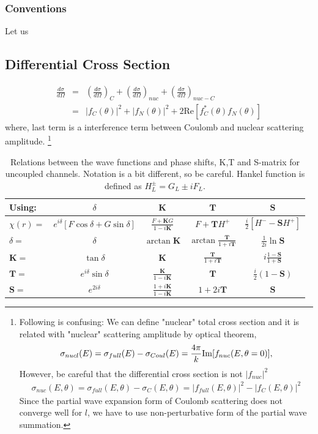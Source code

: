 \documentclass[10pt]{book}
\def\bm{\boldsymbol}
\newcommand{\bea}{\begin{eqnarray}}
\newcommand{\eea}{\end{eqnarray}}
\newcommand{\no}{\nonumber \\}
\begin{document}
\subsubsection{Conventions} 

Let us 




\subsection{Differential Cross Section}
\bea
\frac{d\sigma}{d\Omega}&=&\left( \frac{d\sigma}{d\Omega}\right)_C
+\left( \frac{d\sigma}{d\Omega}\right)_{nuc}
+\left( \frac{d\sigma}{d\Omega}\right)_{nuc-C}  \no 
 &=& |f_C(\theta)|^2+|f_N(\theta)|^2+2\mbox{Re}[f_C^*(\theta) f_N(\theta)]
\eea 
where, last term is a interference term between Coulomb and nuclear scattering amplitude.
\footnote{ Following is confusing: 
We can define "nuclear" total cross section and it is related with
"nuclear" scattering amplitude by optical theorem,
\bea
\sigma_{nucl}(E)=\sigma_{full}(E)-\sigma_{Coul}(E)
                =\frac{4\pi}{k}{\rm Im}[f_{nuc}(E,\theta=0)],
\eea
However, be careful that the differential cross section is not $|f_{nuc}|^2$
\bea
\sigma_{nuc}(E,\theta)=\sigma_{full}(E,\theta)-\sigma_{C}(E,\theta)
                      =|f_{full}(E,\theta)|^2-|f_{C}(E,\theta)|^2
\eea
Since the partial wave expansion form of Coulomb scattering does not 
converge well for $l$, we have to use non-perturbative form of the 
partial wave summation.
}

\begin{table}[h]
\begin{center}
\caption{Relations between the wave functions 
and phase shifts, K,T and S-matrix for uncoupled channels.
Notation is a bit different, so be careful. Hankel function 
is defined as $H^{\pm}_L=G_L\pm i F_L$. 
}
\begin{tabular}{lcccc}
\hline
Using: & $\delta$ & ${\bm K}$ & ${\bm T}$ & ${\bm S}$ \\
\hline
$\chi(r)=$ & $e^{i\delta}[F\cos\delta+G\sin\delta] $
           & $\frac{F+{\bm K}G}{1-i{\bm K}}$
           & $F+{\bm T}H^{+}$
           & $\frac{i}{2}[H^{-}-{\bm S} H^{+}]$ \\
$\delta=$  & $\delta$  
           & $\arctan{\bm K}$
           & $\arctan\frac{\bm T}{1+i{\bm T}}$
           & $\frac{1}{2i}\ln {\bm S}$\\ 
${\bm K}=$ & $\tan\delta$ 
           & ${\bm K}$
           & $\frac{\bm T}{1+i{\bm T}}$
           & $i\frac{1-{\bm S}}{1+{\bm S}}$ \\
${\bm T}=$ & $e^{i\delta}\sin\delta$
           & $\frac{\bm K}{1-i{\bm K}}$
           & ${\bm T}$
           & $\frac{i}{2}(1-{\bm S})$ \\
${\bm S}=$ & $e^{2i\delta}$ 
           & $\frac{1+i{\bm K}}{1-i{\bm K}}$
           & $1+2i{\bm T}$
           & ${\bm S}$\\
\hline
\end{tabular}
\end{center}
\end{table}
\end{document}

